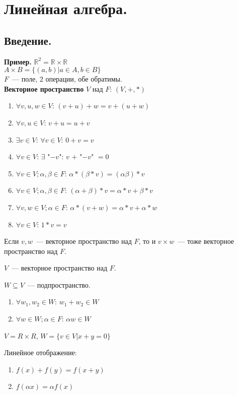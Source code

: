 \documentclass[12pt]{article}
\begin{document}
	\tableofcontents
	\setcounter{tocdepth}{3}
	\newpage
	\section{Линейная алгебра.}
	\subsection{Введение.}
	\textbf{Пример.} $\mathbb{R}^2 = \mathbb{R} \times \mathbb{R}$ \\
	$A \times B = \{ (a, b) | a \in A, b \in B \}$ \\
	$F$~--- поле, $2$ операции, обе обратимы. \\
	\textbf{Векторное пространство} $V$ над $F$: $(V, +, *)$
	\begin{enumerate}
		\item $\forall v, u, w \in V$: $(v + u) + w = v + (u + w)$
		\item $\forall v, u \in V$: $v + u = u + v$
		\item $\exists v \in V$: $\forall v \in V$: $0 + v = v$
		\item $\forall v \in V$: $\exists$ "$-v$": $v$ $+$ "$-v$" $= 0$
		\item $\forall v \in V; \alpha, \beta \in F$: $\alpha * (\beta * v) = (\alpha \beta) * v$
		\item $\forall v \in V; \alpha, \beta \in F$: $(\alpha + \beta) * v = \alpha * v + \beta * v$
		\item $\forall v, w \in V; \alpha \in F$: $\alpha * (v + w) = \alpha * v + \alpha * w$
		\item $\forall v \in V$: $1 * v = v$
	\end{enumerate}
	\begin{statement}
		Если $v, w$~--- векторное пространство над $F$, то и $v \times w$~--- тоже векторное пространство над $F$.
	\end{statement}
	\noindent
	$V$~--- векторное пространство над $F$.
	\begin{definition}
		$W \subseteq V$~--- подпространство.
		\begin{enumerate}
			\item $\forall w_1, w_2 \in W$: $w_1 + w_2 \in W$
			\item $\forall w \in W; \alpha \in F$: $\alpha w \in W$
		\end{enumerate}
	\end{definition}
	\noindent
	$V = R \times R$, $W = \{ v \in V | x + y = 0 \}$
	\begin{definition}
		Линейное отображение:
		\begin{enumerate}
			\item $f(x) + f(y) = f(x + y)$
			\item $f(\alpha x) = \alpha f(x)$
		\end{enumerate}
	\end{definition} 
\end{document}
